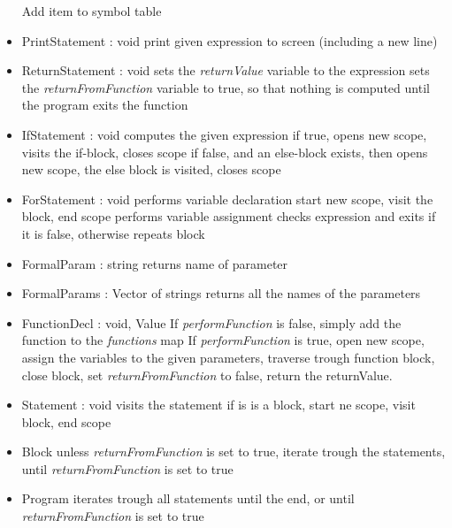 \begin{itemize}
		\subitem Add item to symbol table
	\item PrintStatement : void
		\subitem print given expression to screen (including a new line)
	\item ReturnStatement : void
		\subitem sets the \textit{returnValue} variable to the expression
		\subitem sets the \textit{returnFromFunction} variable to true, so that nothing is computed until the program exits the function
	\item IfStatement : void
		\subitem computes the given expression
		\subitem if true, opens new scope, visits the if-block, closes scope
		\subitem if false, and an else-block exists, then opens new scope, the else block is visited, closes scope
	\item ForStatement : void
		\subitem performs variable declaration
		\subitem start new scope, visit the block, end scope
		\subitem performs variable assignment
		\subitem checks expression and exits if it is false, otherwise repeats block
	\item FormalParam : string
		\subitem returns name of parameter
	\item FormalParams : Vector of strings
		\subitem returns all the names of the parameters
	\item FunctionDecl : void, Value
		\subitem If \textit{performFunction} is false, simply add the function to the \textit{functions} map
		\subitem If \textit{performFunction} is true, open new scope, assign the variables to the given parameters, traverse trough function block, close block, set \textit{returnFromFunction} to false, return the returnValue.
	\item Statement : void
		\subitem visits the statement
		\subitem if is is a block, start ne scope, visit block, end scope
	\item Block
		\subitem unless \textit{returnFromFunction} is set to true, iterate trough the statements, until \textit{returnFromFunction} is set to true
	\item Program
		\subitem iterates trough all statements until the end, or until \textit{returnFromFunction} is set to true
\end{itemize}
